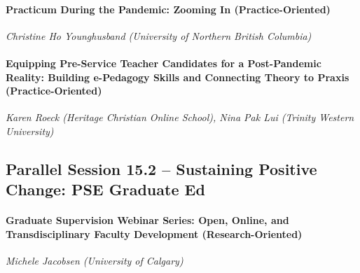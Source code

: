 \documentclass[
]{book}
\begin{document}
\begin{secondary}
\hypertarget{practicum-during-the-pandemic-zooming-in-practice-oriented}{%
\paragraph{Practicum During the Pandemic: Zooming In
(Practice-Oriented)}\label{practicum-during-the-pandemic-zooming-in-practice-oriented}}

\emph{Christine Ho Younghusband (University of Northern British
Columbia)}
\end{secondary}

\begin{secondary}
\hypertarget{equipping-pre-service-teacher-candidates-for-a-post-pandemic-reality-building-e-pedagogy-skills-and-connecting-theory-to-praxis-practice-oriented}{%
\paragraph{Equipping Pre-Service Teacher Candidates for a Post-Pandemic
Reality: Building e-Pedagogy Skills and Connecting Theory to Praxis
(Practice-Oriented)}\label{equipping-pre-service-teacher-candidates-for-a-post-pandemic-reality-building-e-pedagogy-skills-and-connecting-theory-to-praxis-practice-oriented}}

\emph{Karen Roeck (Heritage Christian Online School), Nina Pak Lui
(Trinity Western University)}
\end{secondary}

\hypertarget{parallel-session-15.2-sustaining-positive-change-pse-graduate-ed}{%
\subsection*{Parallel Session 15.2 -- Sustaining Positive Change: PSE Graduate Ed}\label{parallel-session-15.2-sustaining-positive-change-pse-graduate-ed}}

\begin{secondary}
\hypertarget{graduate-supervision-webinar-series-open-online-and-transdisciplinary-faculty-development-research-oriented}{%
\paragraph{Graduate Supervision Webinar Series: Open, Online, and
Transdisciplinary Faculty Development
(Research-Oriented)}\label{graduate-supervision-webinar-series-open-online-and-transdisciplinary-faculty-development-research-oriented}}

\emph{Michele Jacobsen (University of Calgary)}
\end{secondary}
\end{document}
